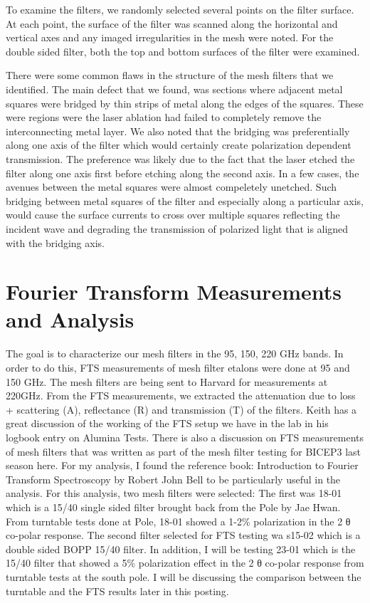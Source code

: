 \documentclass[12pt]{article}
\begin{document}
To examine the filters, we randomly selected several points on the filter surface. At each point, the surface of the filter was scanned along the horizontal and vertical axes and any imaged irregularities in the mesh were noted. For the  double sided filter, both the top and bottom surfaces of the filter were examined. 


There were some common flaws in the structure of the mesh filters that we identified. The main defect that we found, was  sections where adjacent metal squares were bridged by thin strips of metal along the edges of the squares. These were regions were the laser ablation had failed to completely remove the interconnecting metal layer. We also noted that the bridging was preferentially along one axis of the filter which would certainly create polarization dependent transmission. The preference was likely due to the fact that the laser etched the filter along one axis first before etching along the second axis. In a few cases, the avenues between the metal squares were almost compeletely unetched. Such bridging between metal squares of the filter and especially along a particular axis, would cause the surface currents to cross over multiple squares reflecting the incident wave and degrading the transmission of polarized light that is aligned with the bridging axis.


\section{Fourier Transform Measurements and Analysis}
The goal is to characterize our mesh filters in the 95, 150, 220 GHz bands. In order to do this, FTS measurements of mesh filter etalons were done at 95 and 150 GHz. The mesh filters are being sent to Harvard for measurements at 220GHz. From the FTS measurements, we extracted the attenuation due to loss + scattering (A), reflectance (R) and transmission (T) of the filters. Keith has a great discussion of the working of the FTS setup we have in the lab in his logbook entry on Alumina Tests. There is also a discussion on FTS measurements of mesh filters that was written as part of the mesh filter testing for BICEP3 last season here. For my analysis, I found the reference book: Introduction to Fourier Transform Spectroscopy by Robert John Bell to be particularly useful in the analysis.
For this analysis, two mesh filters were selected: The first was 18-01 which is a 15/40 single sided filter brought back from the Pole by Jae Hwan. From turntable tests done at Pole, 18-01 showed a 1-2\% polarization in the 2 θ co-polar response. The second filter selected for FTS testing wa s15-02 which is a double sided BOPP 15/40 filter. In addition, I will be testing 23-01 which is the 15/40 filter that showed a 5\% polarization effect in the 2 θ co-polar response from turntable tests at the south pole. I will be discussing the comparison between the turntable and the FTS results later in this posting.
\end{document}
